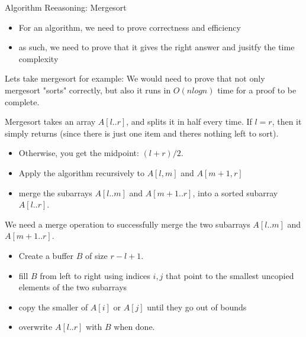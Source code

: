 \documentclass[journal, letterpaper]{IEEEtran}
\begin{document}
\begin{example}{Algorithm Reeasoning: Mergesort}\\
    \begin{itemize}
        \item For an algorithm, we need to prove correctness and efficiency
        \item as such, we need to prove that it gives the right answer and jusitfy the
            time complexity
    \end{itemize}

    Lets take mergesort for example:
    We would need to prove that not only mergesort "sorts" correctly, but also it runs in
    $O(nlogn)$ time for a proof to be complete.

    Mergesort takes an array $A[l..r]$, and splits it in half every time. If $l = r$, then
    it simply returns (since there is just one item and theres nothing left to sort).
    \begin{itemize}
        \item Otherwise, you get the midpoint: $(l + r)/2$.
        \item Apply the algorithm recursively to $A[l, m]$ and $A[m+1, r]$
        \item merge the subarrays $A[l..m]$ and $A[m+1..r]$, into a sorted subarray
            $A[l..r]$.
    \end{itemize}

    We need a merge operation to successfully merge the two subarrays $A[l..m]$ and
    $A[m+1..r]$.
    \begin{itemize}
        \item Create a buffer $B$ of size $r - l + 1$. 
        \item fill $B$ from left to right using indices $i, j$ that point to the smallest
            uncopied elements of the two subarrays
        \item copy the smaller of $A[i]$ or $A[j]$ until they go out of bounds
        \item overwrite $A[l..r]$ with $B$ when done.
    \end{itemize}
\end{example}
\end{document}
